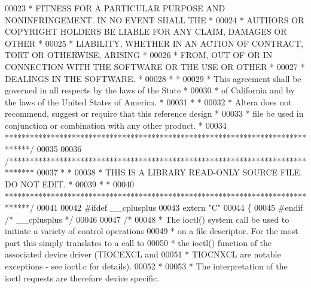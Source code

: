 \begin{DoxyCode}
00023 \textcolor{comment}{* FITNESS FOR A PARTICULAR PURPOSE AND NONINFRINGEMENT. IN NO EVENT SHALL THE *}
00024 \textcolor{comment}{* AUTHORS OR COPYRIGHT HOLDERS BE LIABLE FOR ANY CLAIM, DAMAGES OR OTHER      *}
00025 \textcolor{comment}{* LIABILITY, WHETHER IN AN ACTION OF CONTRACT, TORT OR OTHERWISE, ARISING     *}
00026 \textcolor{comment}{* FROM, OUT OF OR IN CONNECTION WITH THE SOFTWARE OR THE USE OR OTHER         *}
00027 \textcolor{comment}{* DEALINGS IN THE SOFTWARE.                                                   *}
00028 \textcolor{comment}{*                                                                             *}
00029 \textcolor{comment}{* This agreement shall be governed in all respects by the laws of the State   *}
00030 \textcolor{comment}{* of California and by the laws of the United States of America.              *}
00031 \textcolor{comment}{*                                                                             *}
00032 \textcolor{comment}{* Altera does not recommend, suggest or require that this reference design    *}
00033 \textcolor{comment}{* file be used in conjunction or combination with any other product.          *}
00034 \textcolor{comment}{******************************************************************************/}
00035 
00036 \textcolor{comment}{/******************************************************************************}
00037 \textcolor{comment}{*                                                                             *}
00038 \textcolor{comment}{* THIS IS A LIBRARY READ-ONLY SOURCE FILE. DO NOT EDIT.                       *}
00039 \textcolor{comment}{*                                                                             *}
00040 \textcolor{comment}{******************************************************************************/}
00041 
00042 \textcolor{preprocessor}{#ifdef \_\_cplusplus}
00043 \textcolor{keyword}{extern} \textcolor{stringliteral}{"C"}
00044 \{
00045 \textcolor{preprocessor}{#endif }\textcolor{comment}{/* \_\_cplusplus */}\textcolor{preprocessor}{}
00046 
00047 \textcolor{comment}{/*}
00048 \textcolor{comment}{ * The ioctl() system call be used to initiate a variety of control operations}
00049 \textcolor{comment}{ * on a file descriptor. For the most part this simply translates to a call to}
00050 \textcolor{comment}{ * the ioctl() function of the associated device driver (TIOCEXCL and}
00051 \textcolor{comment}{ * TIOCNXCL are notable exceptions - see ioctl.c for details).}
00052 \textcolor{comment}{ *}
00053 \textcolor{comment}{ * The interpretation of the ioctl requests are therefore device specific.}

\end{DoxyCode}
